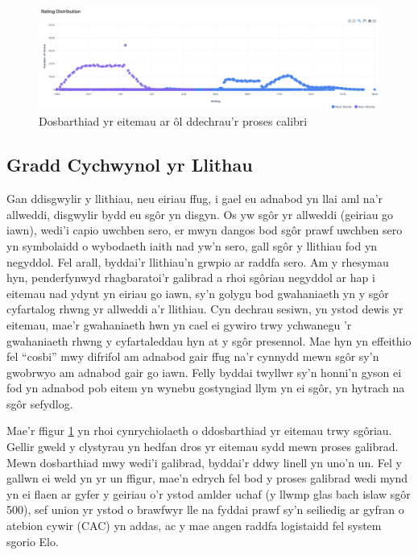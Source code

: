 \begin{figure}
    \centering
    \includegraphics[width=0.9\linewidth]{figures/distribution-items.png}
    \caption{Dosbarthiad yr eitemau ar ôl ddechrau'r proses calibri}
    \label{fig:distribution}
\end{figure}

\subsection{Gradd Cychwynol yr Llithau}
Gan ddisgwylir y llithiau, neu eiriau ffug, i gael eu adnabod yn llai aml na'r allweddi, disgwylir bydd eu sgôr yn disgyn. Os yw sgôr yr allweddi (geiriau go iawn), wedi'i capio uwchben sero, er mwyn dangos bod sgôr prawf uwchben sero yn symbolaidd o wybodaeth iaith nad yw'n sero, gall sgôr y llithiau fod yn negyddol. Fel arall, byddai'r llithiau'n grwpio ar raddfa sero. Am y rhesymau hyn, penderfynwyd rhagbaratoi'r galibrad a rhoi sgôriau negyddol ar hap i eitemau nad ydynt yn eiriau go iawn, sy'n golygu bod gwahaniaeth yn y sgôr cyfartalog rhwng yr allweddi a'r llithiau. Cyn dechrau sesiwn, yn ystod dewis yr eitemau, mae'r gwahaniaeth hwn yn cael ei gywiro trwy ychwanegu 'r gwahaniaeth rhwng y cyfartaleddau hyn at y sgôr presennol.  Mae hyn yn effeithio fel ``cosbi'' mwy difrifol am adnabod gair ffug na'r cynnydd mewn sgôr sy'n gwobrwyo am adnabod gair go iawn. Felly byddai twyllwr sy'n honni'n gyson ei fod yn adnabod pob eitem yn wynebu gostyngiad llym yn ei sgôr, yn hytrach na sgôr sefydlog.

Mae'r ffigur \ref{fig:distribution} yn rhoi cynrychiolaeth o ddosbarthiad yr eitemau trwy sgôriau. Gellir gweld y clystyrau yn hedfan dros yr eitemau sydd mewn proses galibrad. Mewn dosbarthiad mwy wedi'i galibrad, byddai'r ddwy linell yn uno'n un. Fel y gallwn ei weld yn yr un ffigur, mae'n edrych fel bod y proses galibrad wedi mynd yn ei flaen ar gyfer y geiriau o'r ystod amlder uchaf (y llwmp glas bach islaw sgôr 500), sef union yr ystod o brawfwyr lle na fyddai prawf sy'n seiliedig ar gyfran o atebion cywir (CAC) yn addas, ac y mae angen raddfa logistaidd fel system sgorio Elo.

